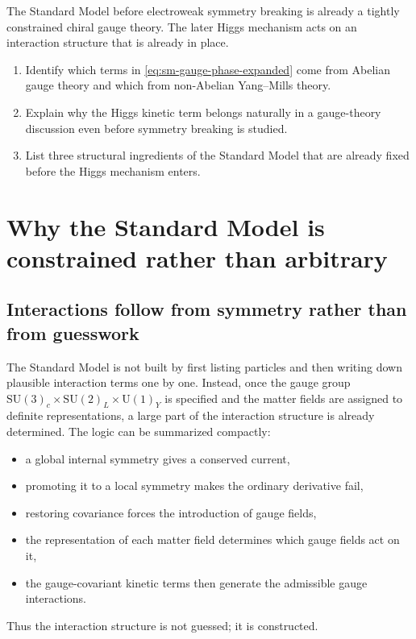 \documentclass[11pt,a4paper]{article}
\newcommand{\SMgauge}{\mathrm{SU}(3)_c \times \mathrm{SU}(2)_L \times \mathrm{U}(1)_Y}
\begin{document}
\begin{takehomebox}
\vspace{0.25cm}
The Standard Model before electroweak symmetry breaking is already a tightly constrained chiral gauge theory. The later Higgs mechanism acts on an interaction structure that is already in place.
\end{takehomebox}



\begin{guidedchecksbox}
\vspace{0.25cm}
\begin{enumerate}[leftmargin=1.6em,label=\arabic*.]
    \item Identify which terms in \eqref{eq:sm-gauge-phase-expanded} come from Abelian gauge theory and which from non-Abelian Yang--Mills theory.
    \item Explain why the Higgs kinetic term belongs naturally in a gauge-theory discussion even before symmetry breaking is studied.
    \item List three structural ingredients of the Standard Model that are already fixed before the Higgs mechanism enters.
\end{enumerate}
\end{guidedchecksbox}





\section{Why the Standard Model is constrained rather than arbitrary}



\subsection{Interactions follow from symmetry rather than from guesswork}



The Standard Model is not built by first listing particles and then writing down plausible interaction terms one by one. Instead, once the gauge group {\color{red}\(\SMgauge\)} is specified and the matter fields are assigned to definite representations, a large part of the interaction structure is already determined. The logic can be summarized compactly:
\begin{itemize}[leftmargin=1.7em]
    \item a global internal symmetry gives a conserved current,
    \item promoting it to a local symmetry makes the ordinary derivative fail,
    \item restoring covariance forces the introduction of gauge fields,
    \item the representation of each matter field determines which gauge fields act on it,
    \item the gauge-covariant kinetic terms then generate the admissible gauge interactions.
\end{itemize}
Thus the interaction structure is not guessed; it is constructed.
\end{document}
